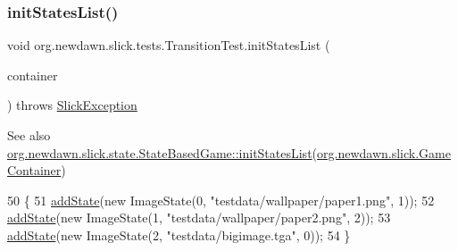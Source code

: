 \subsubsection{\texorpdfstring{init\+States\+List()}{initStatesList()}}
{\footnotesize\ttfamily void org.\+newdawn.\+slick.\+tests.\+Transition\+Test.\+init\+States\+List (\begin{DoxyParamCaption}\item[{\mbox{\hyperlink{classorg_1_1newdawn_1_1slick_1_1_game_container}{Game\+Container}}}]{container }\end{DoxyParamCaption}) throws \mbox{\hyperlink{classorg_1_1newdawn_1_1slick_1_1_slick_exception}{Slick\+Exception}}\hspace{0.3cm}{\ttfamily [inline]}}

\begin{DoxySeeAlso}{See also}
\mbox{\hyperlink{classorg_1_1newdawn_1_1slick_1_1state_1_1_state_based_game_af62d7a82f042c5b2d73e102ab94a07c0}{org.\+newdawn.\+slick.\+state.\+State\+Based\+Game\+::init\+States\+List}}(\mbox{\hyperlink{classorg_1_1newdawn_1_1slick_1_1_game_container}{org.\+newdawn.\+slick.\+Game\+Container}}) 
\end{DoxySeeAlso}

\begin{DoxyCode}
50                                                                               \{
51         \mbox{\hyperlink{classorg_1_1newdawn_1_1slick_1_1state_1_1_state_based_game_acfd4acadb4a4f79fddd7e76250da37dc}{addState}}(\textcolor{keyword}{new} ImageState(0, \textcolor{stringliteral}{"testdata/wallpaper/paper1.png"}, 1));
52         \mbox{\hyperlink{classorg_1_1newdawn_1_1slick_1_1state_1_1_state_based_game_acfd4acadb4a4f79fddd7e76250da37dc}{addState}}(\textcolor{keyword}{new} ImageState(1, \textcolor{stringliteral}{"testdata/wallpaper/paper2.png"}, 2));
53         \mbox{\hyperlink{classorg_1_1newdawn_1_1slick_1_1state_1_1_state_based_game_acfd4acadb4a4f79fddd7e76250da37dc}{addState}}(\textcolor{keyword}{new} ImageState(2, \textcolor{stringliteral}{"testdata/bigimage.tga"}, 0));
54     \}
\end{DoxyCode}
\mbox{\label{classorg_1_1newdawn_1_1slick_1_1tests_1_1_transition_test_acf364163c9f1de4c97c74af9d7c18db2}} 
